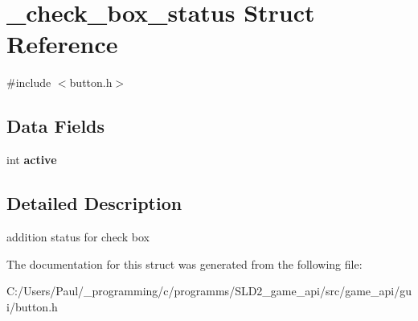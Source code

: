 \hypertarget{struct__check__box__status}{\section{\+\_\+check\+\_\+box\+\_\+status Struct Reference}
\label{struct__check__box__status}
}


{\ttfamily \#include $<$button.\+h$>$}

\subsection*{Data Fields}
\begin{DoxyCompactItemize}
\item 
\hypertarget{struct__check__box__status_aa5805c5e936174e5092bf7a5b78e7e64}{int {\bfseries active}}\label{struct__check__box__status_aa5805c5e936174e5092bf7a5b78e7e64}

\end{DoxyCompactItemize}


\subsection{Detailed Description}
addition status for check box 

The documentation for this struct was generated from the following file\+:\begin{DoxyCompactItemize}
\item 
C\+:/\+Users/\+Paul/\+\_\+programming/c/programms/\+S\+L\+D2\+\_\+game\+\_\+api/src/game\+\_\+api/gui/button.\+h\end{DoxyCompactItemize}
